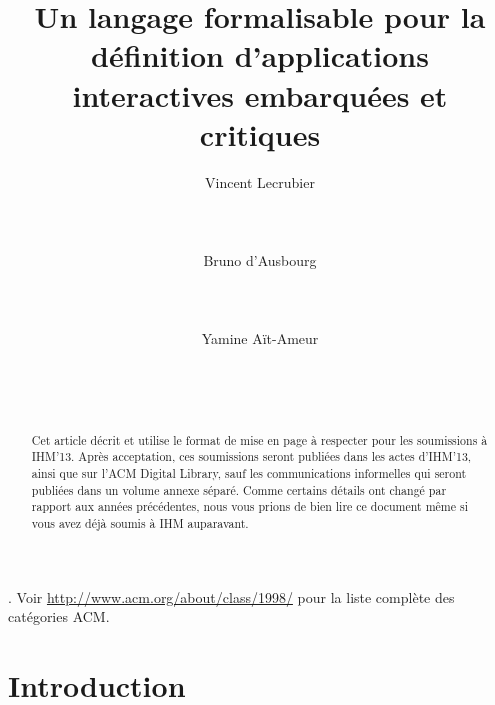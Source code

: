 \documentclass{ihm}
\begin{document}
\title{Un langage formalisable pour la définition d'applications interactives
  embarquées et critiques}

\author{
  \alignauthor Vincent Lecrubier\\
    \\
    \\
    \\
  \alignauthor Bruno d'Ausbourg\\
    \\
    \\
    \\
  \alignauthor Yamine Aït-Ameur\\
    \\
    \\
    \\
}

\maketitle

\begin{abstract}
Cet article décrit et utilise le format de mise en page à respecter pour les
soumissions à IHM'13. Après acceptation, ces soumissions seront publiées dans
les actes d'IHM'13, ainsi que sur l'ACM Digital Library, sauf les communications
informelles qui seront publiées dans un volume annexe séparé. Comme certains
détails ont changé par rapport aux années précédentes, nous vous prions de bien
lire ce document même si vous avez déjà soumis à IHM auparavant.
\end{abstract}


.
Voir \url{http://www.acm.org/about/class/1998/} pour la liste complète des catégories ACM.

\section{Introduction}
\end{document}
